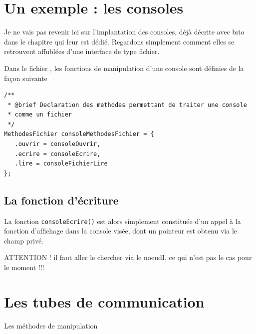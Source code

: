 %
\section{Un exemple : les consoles}

   Je ne vais pas revenir ici sur l'implantation des consoles, déjà
décrite avec brio dans le chapitre qui leur est dédié. Regardons
simplement comment elles se retrouvent affublées d'une interface de
type fichier.

   Dans le fichier , les fonctions de
manipulation d'une console sont définies de la façon suivante

\begin{lstlisting}
/**
 * @brief Declaration des methodes permettant de traiter une console
 * comme un fichier
 */
MethodesFichier consoleMethodesFichier = {
   .ouvrir = consoleOuvrir,
   .ecrire = consoleEcrire,
   .lire = consoleFichierLire
};
\end{lstlisting}

%
\subsection{La fonction d'écriture}

   La fonction \lstinline!consoleEcrire()! est alors simplement
constituée d'un appel à la fonction d'affichage dans la console visée,
dont un pointeur est obtenu via le champ privé.

   ATTENTION ! il faut aller le chercher via le noeudI, ce qui n'est
   pas le cas pour le moment !!!
   
%
\section{Les tubes de communication}

Les méthodes de manipulation
